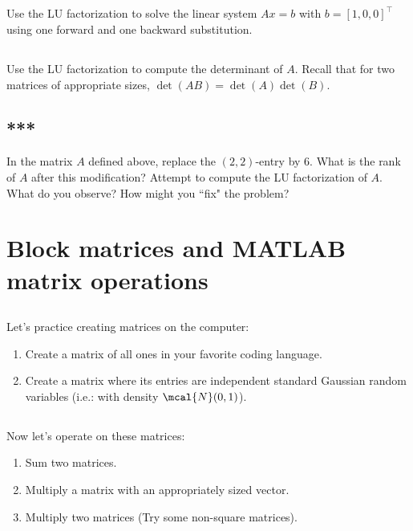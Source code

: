 \documentclass[11pt,letterpaper]{report}
\begin{document}
\subsection{}
Use the LU factorization to solve the linear system $Ax=b$ with
  $b=[1, 0, 0]^\top$ using one forward and one backward substitution.
  
\subsection{}\label{sec:3.1d}
Use the LU factorization to compute the determinant of
$A$. Recall that for two matrices of appropriate sizes,
$\det(AB)=\det(A)\det(B)$.
  
\subsection{***}
In the matrix $A$ defined above, replace the $(2,2)$-entry by $6$.
What is the rank of $A$ after this modification?
Attempt to compute the LU factorization of $A$. 
What do you observe?
How might you ``fix" the problem?

\section{Block matrices and MATLAB matrix operations}
\subsection{}
Let's practice creating matrices on the computer:
\begin{enumerate}
    \item Create a matrix of all ones in your favorite coding language.
    \item Create a matrix where its entries are independent standard Gaussian random variables (i.e.: with density $\mcal{N}(0,1)$). 
\end{enumerate}

\subsection{}
Now let's operate on these matrices:
\begin{enumerate}
    \item Sum two matrices.
    \item Multiply a matrix with an appropriately sized vector.
    \item Multiply two matrices (Try some non-square matrices).
\end{enumerate}
\end{document}
